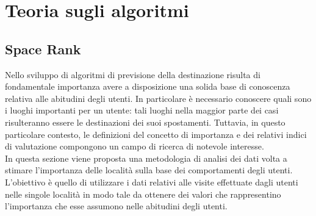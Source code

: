 \chapter{Teoria sugli algoritmi}

\section{Space Rank}
Nello sviluppo di algoritmi di previsione della destinazione risulta di fondamentale
importanza avere a disposizione una solida base di conoscenza relativa alle
abitudini degli utenti. In particolare \`e necessario conoscere quali sono i luoghi
importanti per un utente: tali luoghi nella maggior parte dei casi risulteranno
essere le destinazioni dei suoi spostamenti. Tuttavia, in questo particolare
contesto, le definizioni del concetto di importanza e dei relativi indici di valutazione
compongono un campo di ricerca di notevole interesse.\\
In questa sezione viene proposta una metodologia di analisi dei dati volta
a stimare l'importanza delle localit\`a sulla base dei comportamenti degli utenti.
L'obiettivo \`e quello di utilizzare i dati relativi alle visite effettuate dagli utenti
nelle singole localit\`a in modo tale da ottenere dei valori che rappresentino
l'importanza che esse assumono nelle abitudini degli utenti.

